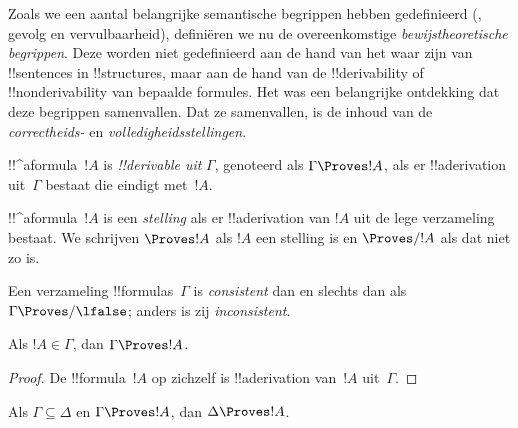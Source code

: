 \documentclass[../../../include/open-logic-section]{subfiles}
\begin{document}
      {}
      {}


\begin{explain}
Zoals we een aantal belangrijke semantische begrippen hebben
gedefinieerd (, gevolg en
vervulbaarheid), definiëren we nu de overeenkomstige
\emph{bewijstheoretische begrippen}. Deze worden niet gedefinieerd aan
de hand van het waar zijn van !!{sentence}s in !!{structure}s, maar aan
de hand van de !!{derivability} of !!{nonderivability} van bepaalde
formules. Het was een belangrijke ontdekking dat deze begrippen
samenvallen. Dat ze samenvallen, is de inhoud van de
\emph{correctheids-} en \emph{volledigheidsstellingen}.
\end{explain}

\begin{defn}[!!^{derivability}]
!!^a{formula}~$!A$ is \emph{!!{derivable} uit} $\Gamma$, genoteerd als
$\Gamma \Proves !A$, als er !!a{derivation} uit~$\Gamma$ bestaat die
eindigt met~$!A$.
\end{defn}

\begin{defn}[Stellingen]
!!^a{formula}~$!A$ is een \emph{stelling} als er !!a{derivation} van
$!A$ uit de lege verzameling bestaat. We schrijven $\Proves !A$ als
$!A$ een stelling is en $\Proves/ !A$ als dat niet zo is.
\end{defn}

\begin{defn}[Consistentie]
Een verzameling !!{formula}s~$\Gamma$ is \emph{consistent} dan en
slechts dan als $\Gamma\Proves/ \lfalse$; anders is zij
\emph{inconsistent}.
\end{defn}

\begin{prop}[Reflexiviteit]
Als $!A \in \Gamma$, dan $\Gamma \Proves !A$.
\end{prop}

\begin{proof}
  De !!{formula}~$!A$ op zichzelf is !!a{derivation} van~$!A$
  uit~$\Gamma$.
\end{proof}

\begin{prop}[Monotoniciteit]
Als $\Gamma \subseteq \Delta$ en $\Gamma \Proves !A$, dan $\Delta
\Proves !A$.
\end{prop}
\end{document}

